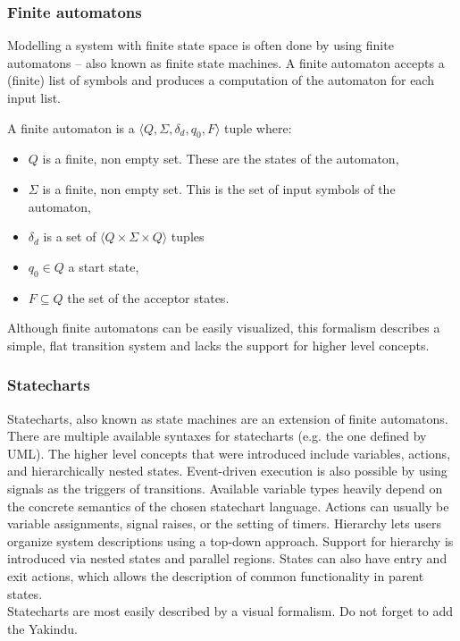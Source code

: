     \subsubsection{Finite automatons}
Modelling a system with finite state space is often done by using finite automatons -- also known as finite state machines. A finite automaton accepts a (finite) list of symbols and produces a computation of the automaton for each input list.
      \begin{dfn}
        \label{dfn:fa}
A finite automaton is a $\langle Q,\Sigma,\delta_d,q_0, F \rangle$ tuple where:
        \begin{itemize}
          \item $Q$ is a finite, non empty set. These are the states of the automaton,
          \item $\Sigma$ is a finite, non empty set. This is the set of input symbols of the automaton,
          \item $\delta_d$ is a set of $\langle Q \times \Sigma \times Q \rangle$ tuples
          \item $q_0 \in Q$ a start state,
          \item $F \subseteq Q$ the set of the acceptor states.
        \end{itemize}
      \end{dfn}
Although finite automatons can be easily visualized, this formalism describes a simple, flat transition system and lacks the support for higher level concepts.
    \subsubsection{Statecharts}
Statecharts, also known as state machines are an extension of finite automatons. There are multiple available syntaxes for statecharts (e.g. the one defined by UML). The higher level concepts that were introduced include variables, actions, and hierarchically nested states. Event-driven execution is also possible by using signals as the triggers of transitions. Available variable types heavily depend on the concrete semantics of the chosen statechart language. Actions can usually be variable assignments, signal raises, or the setting of timers. Hierarchy lets users organize system descriptions using a top-down approach. Support for hierarchy is introduced via nested states and parallel regions. States can also have entry and exit actions, which allows the description of common functionality in parent states.\\
Statecharts are most easily described by a visual formalism.
Do not forget to add the Yakindu.
